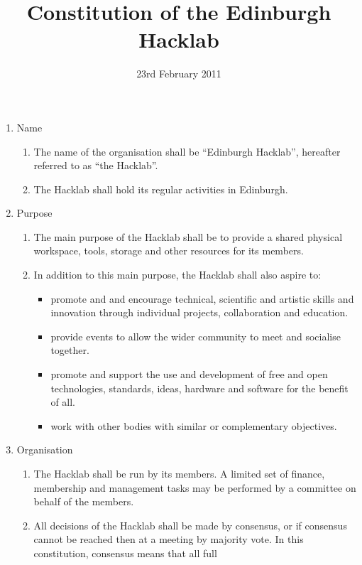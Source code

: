 \documentclass{article}
\title{Constitution of the Edinburgh Hacklab}
\date{23rd February 2011}
\begin{document}
\maketitle
{}
\begin{enumerate}
  \item Name
    \begin{enumerate}
      \item The name of the organisation shall be ``Edinburgh
        Hacklab'', hereafter referred to as ``the Hacklab''.
      \item The Hacklab shall hold its regular activities in Edinburgh.
    \end{enumerate} %
  \item Purpose
    \begin{enumerate}
    \item The main purpose of the Hacklab shall be to provide a shared
      physical workspace, tools, storage and other resources for its
      members.
      \item In addition to this main purpose, the Hacklab shall also aspire to:
        \begin{itemize}
        \item promote and and encourage technical, scientific and
          artistic skills and innovation through individual projects,
          collaboration and education.
        \item provide events to allow the wider community to meet and
          socialise together. 
          \item promote and support the use and development of free
            and open technologies, standards, ideas, hardware and
            software for the benefit of all.
          \item work with other bodies with similar or complementary
            objectives.
        \end{itemize}
    \end{enumerate} %
  \item Organisation
    \begin{enumerate}
    \item The Hacklab shall be run by its members. A limited set of
      finance, membership and management tasks may be performed by a
      committee on behalf of the members.
    \item All decisions of the Hacklab shall be made by consensus, or
      if consensus cannot be reached then at a meeting by majority
      vote. In this constitution, consensus means that all full

\end{enumerate}
\end{enumerate}
\end{document}
